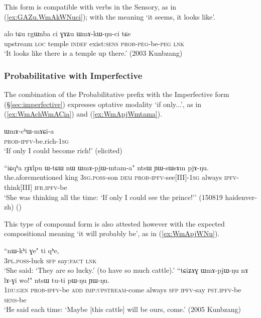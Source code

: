 This form is compatible with verbs in the Sensory, as in (\ref{ex:GAZu.WmAkWNuci}); with the meaning `it seems, it looks like'.

\begin{exe}
\ex \label{ex:GAZu.WmAkWNuci}
\gll alo tɕu rgɯnba ci ɣɤʑu ɯmɤ-kɯ-ŋu-ci tɕe \\
upstream \textsc{loc} temple \textsc{indef} exist:\textsc{sens} \textsc{prob}-\textsc{peg}-be-\textsc{peg} \textsc{lnk} \\
\glt `It looks like there is a temple up there.' (2003 Kunbzang)
\end{exe}

\subsubsection{Probabilitative with Imperfective} \label{sec:WmA.ipfv}
The combination of the Probabilitative prefix with the Imperfective form (§\ref{sec:imperfective}) expresses optative modality `if only...', as in (\ref{ex:WmAchWmACia}) and (\ref{ex:WmApjWmtama}).

\begin{exe}
\ex \label{ex:WmAchWmACia}
\gll ɯmɤ-cʰɯ-mɤɕi-a \\
\textsc{prob}-\textsc{ipfv}-be.rich-\textsc{1sg} \\
\glt `If only I could become rich!' (elicited)
\end{exe}

\begin{exe}
\ex \label{ex:WmApjWmtama}
\gll ``iɕqʰa rɟɤlpu ɯ-tɕɯ nɯ ɯmɤ-pjɯ-mtam-a" ntsɯ ɲɯ-sɯsɤm pjɤ-ŋu. \\
the.aforementioned king \textsc{3sg}.\textsc{poss}-son \textsc{dem} \textsc{prob}-\textsc{ipfv}-see[III]-\textsc{1sg} always \textsc{ipfv}-think[III] \textsc{ifr}.\textsc{ipfv}-be \\
\glt `She was thinking all the time: `If only I could see the prince!'' (150819 haidenver-zh)
()
\end{exe}

This type of compound form is also attested however with the expected compositional meaning `it will probably be', as in (\ref{ex:WmApjWNu}).

\begin{exe}
\ex 
\begin{xlist}
\ex  
\gll ``nɯ-kʰi ɣe" ti qʰe, \\
\textsc{3pl}.\textsc{poss}-luck \textsc{sfp} say:\textsc{fact} \textsc{lnk} \\
\glt `She said: `They are so lucky.' (to have so much cattle).' 
\ex \label{ex:WmApjWNu}
\gll ``tɕiʑɤɣ ɯmɤ-pjɯ-ŋu nɤ lɤ-ɣi wo!" ntsɯ tu-ti pɯ-ŋu ɲɯ-ŋu. \\
\textsc{1du}:\textsc{gen} \textsc{prob}-\textsc{ipfv}-be \textsc{add} \textsc{imp}:\textsc{upstream}-come always \textsc{sfp} \textsc{ipfv}-say \textsc{pst}.\textsc{ipfv}-be \textsc{sens}-be \\
\glt `He said each time: `Maybe [this cattle] will be ours, come.' (2005 Kunbzang)
\end{xlist}
 \end{exe}
 
